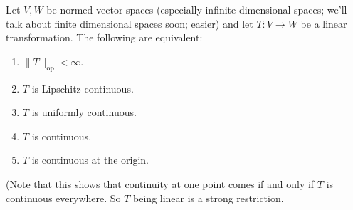 \begin{theorem}\label{thm.op.norm}

Let \(V, W\) be normed vector spaces (especially infinite dimensional spaces; we'll talk about finite dimensional spaces soon; easier) and let \(T: V \to W\) be a linear transformation. The following are equivalent:

\begin{enumerate}

\item \(\lVert T \rVert_{\text{op}} < \infty\).

\item \(T\) is Lipschitz continuous.

\item \(T\) is uniformly continuous.

\item \(T\) is continuous.

\item \(T\) is continuous at the origin.

\end{enumerate}

(Note that this shows that continuity at one point comes if and only if \(T\) is continuous everywhere. So \(T\) being linear is a strong restriction.

\end{theorem}

